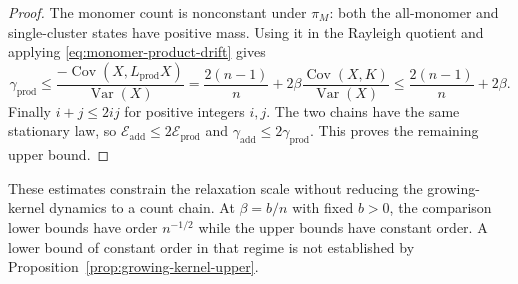 \begin{proof}
The monomer count is nonconstant under $\pi_M$: both the all-monomer
and single-cluster states have positive mass.
Using it in the Rayleigh quotient and applying
\eqref{eq:monomer-product-drift} gives
\[
 \gamma_{\mathrm{prod}}
 \le\frac{-\operatorname{Cov}(X,L_{\mathrm{prod}}X)}
             {\operatorname{Var}(X)}
 =\frac{2(n-1)}n+
       2\beta\frac{\operatorname{Cov}(X,K)}{\operatorname{Var}(X)}
 \le\frac{2(n-1)}n+2\beta.
\]
Finally $i+j\le2ij$ for positive integers $i,j$.
The two chains have the same stationary law, so
$\mathcal E_{\mathrm{add}}\le2\mathcal E_{\mathrm{prod}}$ and
$\gamma_{\mathrm{add}}\le2\gamma_{\mathrm{prod}}$.
This proves the remaining upper bound.
\end{proof}

These estimates constrain the relaxation scale without reducing the
growing-kernel dynamics to a count chain.
At $\beta=b/n$ with fixed $b>0$, the comparison lower bounds have
order $n^{-1/2}$ while the upper bounds have constant order.
A lower bound of constant order in that regime is not established
by Proposition~\ref{prop:growing-kernel-upper}.
